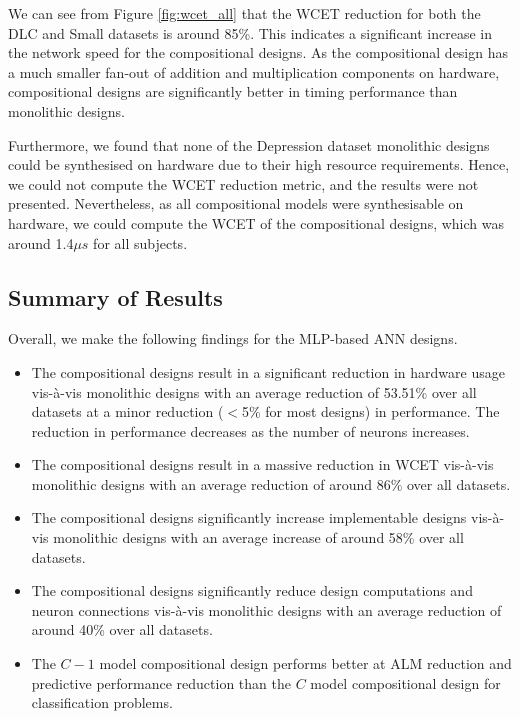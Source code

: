 We can see from Figure \ref{fig:wcet_all} that the WCET reduction for both the DLC and Small datasets is around 85\%. This indicates a significant increase in the network speed for the compositional designs. As the compositional design has a much smaller fan-out of addition and multiplication components on hardware, compositional designs are significantly better in timing performance than monolithic designs. 

Furthermore, we found that none of the Depression dataset monolithic designs could be synthesised on hardware due to their high resource requirements. Hence, we could not compute the WCET reduction metric, and the results were not presented. Nevertheless, as all compositional models were synthesisable on hardware, we could compute the WCET of the compositional designs, which was around 1.4$\mu s$ for all subjects. 

\subsection{Summary of Results}

Overall, we make the following findings for the MLP-based ANN designs.

\begin{itemize}
    \item The compositional designs result in a significant reduction in hardware usage vis-à-vis monolithic designs with an average reduction of 53.51\% over all datasets at a minor reduction ($<$5\% for most designs) in performance. The reduction in performance decreases as the number of neurons increases.
    \item The compositional designs result in a massive reduction in WCET vis-à-vis monolithic designs with an average reduction of around 86\% over all datasets.
    \item The compositional designs significantly increase implementable designs vis-à-vis monolithic designs with an average increase of around 58\% over all datasets.
    \item The compositional designs significantly reduce design computations and neuron connections vis-à-vis monolithic designs with an average reduction of around 40\% over all datasets.
    \item The $C-1$ model compositional design performs better at ALM reduction and predictive performance reduction than the $C$ model compositional design for classification problems.
\end{itemize}


